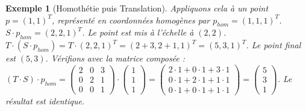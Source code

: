\documentclass{article}
\newtheorem{example}{Exemple}
\begin{document}
\begin{example}[Homothétie puis Translation]
Appliquons cela à un point $p = (1, 1)^T$, représenté en coordonnées homogènes par $p_{hom} = (1, 1, 1)^T$.
$S \cdot p_{hom} = (2, 2, 1)^T$. Le point est mis à l'échelle à $(2, 2)$.
$T \cdot (S \cdot p_{hom}) = T \cdot (2, 2, 1)^T = (2+3, 2+1, 1)^T = (5, 3, 1)^T$. Le point final est $(5, 3)$.
Vérifions avec la matrice composée :
$(T \cdot S) \cdot p_{hom} = \begin{pmatrix} 2 & 0 & 3 \\ 0 & 2 & 1 \\ 0 & 0 & 1 \end{pmatrix} \cdot \begin{pmatrix} 1 \\ 1 \\ 1 \end{pmatrix} = \begin{pmatrix} 2\cdot1 + 0\cdot1 + 3\cdot1 \\ 0\cdot1 + 2\cdot1 + 1\cdot1 \\ 0\cdot1 + 0\cdot1 + 1\cdot1 \end{pmatrix} = \begin{pmatrix} 5 \\ 3 \\ 1 \end{pmatrix}$. Le résultat est identique.
\end{example}
\end{document}

